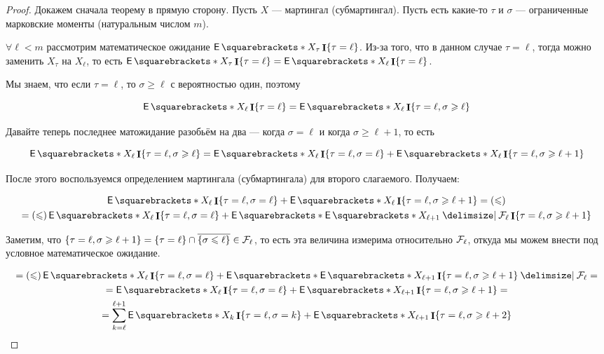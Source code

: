 \begin{proof}
  Докажем сначала теорему в прямую сторону. Пусть $X$ --- мартингал (субмартингал).
  Пусть есть какие-то $\tau$ и $\sigma$ --- ограниченные марковские моменты (натуральным
  числом $m$).

  $\forall \ell < m$ рассмотрим математическое ожидание $\E{X_\tau \I\{\tau = \ell\}}$.
  Из-за того, что в данном случае $\tau = \ell$, тогда можно заменить $X_\tau$ на
  $X_\ell$, то есть  $\E{X_\tau \I\{\tau = \ell\}} = \E{X_\ell \I\{\tau = \ell\}}$.

  Мы знаем, что если $\tau = \ell$, то $\sigma \geq \ell$ с вероятностью один, поэтому

  \[
    \E{X_\ell  \I\{\tau = \ell\}} = \E{X_\ell  \I\{\tau = \ell, \sigma \geq \ell\}}
  \]

  Давайте теперь последнее матожидание разобьём на два --- когда $\sigma = \ell$
  и когда $\sigma \geq \ell + 1$, то есть

  \[
    \E{X_\ell  \I\{\tau = \ell, \sigma \geq \ell\}} = 
    \E{X_\ell  \I\{\tau = \ell, \sigma = \ell\}} + \E{X_\ell  \I\{\tau = \ell, \sigma \geq \ell + 1\}}
  \]

  После этого воспользуемся определением мартингала (субмартингала) для 
  второго слагаемого. Получаем:

  \begin{multline}
    \E{X_\ell  \I\{\tau = \ell, \sigma = \ell\}} + \E{X_\ell  \I\{\tau = \ell, \sigma \geq \ell + 1\}}
    = (\leq)\\= (\leq) \E{X_\ell  \I\{\tau = \ell, \sigma = \ell\}}  +
    \E{\E{X_{\ell + 1} \given \F_\ell} \I\{\tau = \ell, \sigma \geq \ell + 1\}}
  \end{multline}

  Заметим, что $\{\tau = \ell, \sigma \geqslant \ell + 1\} = \{\tau = \ell\} \cap
  \overline{\{\sigma \leqslant \ell\}} \in \mathcal{F}_\ell$, то есть эта величина измерима
  относительно $\mathcal{F}_\ell$, откуда мы можем внести под условное математическое
  ожидание.

  \begin{multline}
    = (\leq) \E{X_\ell  \I\{\tau = \ell, \sigma = \ell\}}  +
    \E{\E{X_{\ell + 1} \I\{\tau = \ell, \sigma \geq \ell + 1\} \given \F_\ell}}
    =\\= \E{X_\ell  \I\{\tau = \ell, \sigma = \ell\}} + \E{X_{\ell + 1}  \I\{\tau = \ell, \sigma \geq \ell + 1\}}
    =\\= \sum\limits_{k = \ell}^{\ell + 1}\E{X_k  \I\{\tau = \ell, \sigma = k\}}
    + \E{X_{\ell + 1}  \I\{\tau = \ell, \sigma \geq \ell + 2\}}
  \end{multline}


\end{proof}
